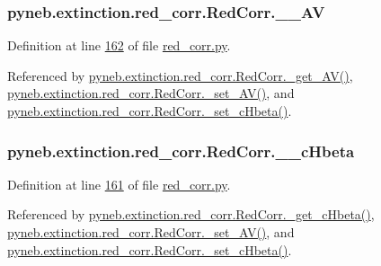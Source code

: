 \begin{DoxyVerb}
\subsubsection[{\+\_\+\+\_\+\+A\+V}]{\setlength{\rightskip}{0pt plus 5cm}pyneb.\+extinction.\+red\+\_\+corr.\+Red\+Corr.\+\_\+\+\_\+\+A\+V\hspace{0.3cm}{\ttfamily [private]}}\label{classpyneb_1_1extinction_1_1red__corr_1_1_red_corr_a476840870719872a12ab48a0d1f1a839}


Definition at line \hyperlink{red__corr_8py_source_l00162}{162} of file \hyperlink{red__corr_8py_source}{red\+\_\+corr.\+py}.



Referenced by \hyperlink{red__corr_8py_source_l00154}{pyneb.\+extinction.\+red\+\_\+corr.\+Red\+Corr.\+\_\+get\+\_\+\+A\+V()}, \hyperlink{red__corr_8py_source_l00169}{pyneb.\+extinction.\+red\+\_\+corr.\+Red\+Corr.\+\_\+set\+\_\+\+A\+V()}, and \hyperlink{red__corr_8py_source_l00164}{pyneb.\+extinction.\+red\+\_\+corr.\+Red\+Corr.\+\_\+set\+\_\+c\+Hbeta()}.

\hypertarget{classpyneb_1_1extinction_1_1red__corr_1_1_red_corr_ab91dff40a007dd632c35d98042077f3d}{}
\subsubsection[{\+\_\+\+\_\+c\+Hbeta}]{\setlength{\rightskip}{0pt plus 5cm}pyneb.\+extinction.\+red\+\_\+corr.\+Red\+Corr.\+\_\+\+\_\+c\+Hbeta\hspace{0.3cm}{\ttfamily [private]}}\label{classpyneb_1_1extinction_1_1red__corr_1_1_red_corr_ab91dff40a007dd632c35d98042077f3d}


Definition at line \hyperlink{red__corr_8py_source_l00161}{161} of file \hyperlink{red__corr_8py_source}{red\+\_\+corr.\+py}.



Referenced by \hyperlink{red__corr_8py_source_l00152}{pyneb.\+extinction.\+red\+\_\+corr.\+Red\+Corr.\+\_\+get\+\_\+c\+Hbeta()}, \hyperlink{red__corr_8py_source_l00169}{pyneb.\+extinction.\+red\+\_\+corr.\+Red\+Corr.\+\_\+set\+\_\+\+A\+V()}, and \hyperlink{red__corr_8py_source_l00164}{pyneb.\+extinction.\+red\+\_\+corr.\+Red\+Corr.\+\_\+set\+\_\+c\+Hbeta()}.


\end{DoxyVerb}

